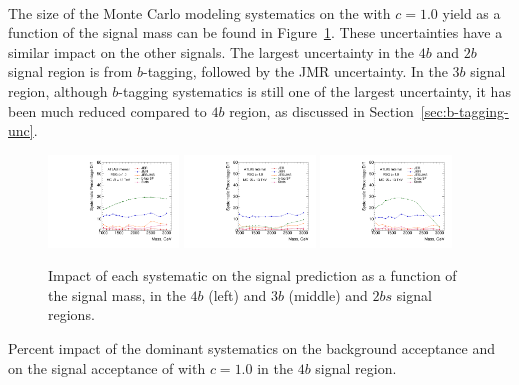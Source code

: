 \paragraph{}
The size of the Monte Carlo modeling systematics on the \Grav with $c=1.0$ yield as a function of the signal mass can be found in Figure~\ref{fig:signal_syst_summary}. 
These uncertainties have a similar impact on the other signals. 
The largest uncertainty in the $4b$ and $2b$ signal region is from $b$-tagging, followed by the JMR uncertainty.
In the $3b$ signal region, although $b$-tagging systematics is still one of the largest uncertainty, it has been much reduced compared to $4b$ region, as discussed in Section~\ref{sec:b-tagging-unc}. 

\begin{figure}[htbp!]
\begin{center}
\includegraphics[width=0.31\textwidth,angle=-90]{figures/boosted/Syst_MC/FourTag_RSG_syst.pdf}
\includegraphics[width=0.31\textwidth,angle=-90]{figures/boosted/Syst_MC/ThreeTag_RSG_syst.pdf}
\includegraphics[width=0.31\textwidth,angle=-90]{figures/boosted/Syst_MC/TwoTag_split_RSG_syst.pdf}
\caption{Impact of each systematic on the signal prediction as a function of the signal mass, in the $4b$ (left) and $3b$ (middle) and $2bs$ signal regions.}
\label{fig:signal_syst_summary}
\end{center}
\end{figure}

\begin{table}[htbp!]
\scriptsize
\begin{center}
\caption{Percent impact of the dominant systematics on the background acceptance
         and on the signal acceptance of \Grav with $c=1.0$ in the $4b$ signal region.}

\label{tab:summary-systematics-4b}
\end{center}
\end{table}

